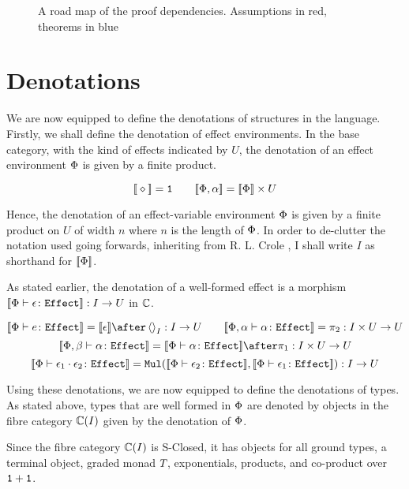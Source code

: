 \documentclass{Report}
\begin{document}
\begin{figure}[h!]
\begin{center}
{
    }
    \end{center}
\caption{A road map of the proof dependencies. Assumptions in red, theorems in blue}
\label{RoadMap}
\end{figure}


\section{Denotations}\label{PECDenotations}
We are now equipped to define the denotations of structures in the language. Firstly, we shall define the denotation of effect environments. In the base category, with the kind of effects indicated by $U$, the denotation of an effect environment $\P$ is given by a finite product.

\[
\deno{\nil} = \1 \quad\quad \deno{\P, \a} = \deno{\P}\times U    
\]

Hence, the denotation of an  effect-variable environment $\P$ is given by a finite product on $U$ of width $n$ where $n$ is the length of $\P$. In order to de-clutter the notation used going forwards, inheriting from R. L. Crole \needsRef, I shall write $I$ as shorthand for $\deno{\P}$.  


As stated earlier, the denotation of a well-formed effect is a morphism $\deno{\typerelation{\P}{\e}{\effect}}: I \rightarrow U$ in $\C$.

\[
    \deno{\typerelation{\P}{e}{\effect}} = \deno{\e} \after \term{I}: I\rightarrow U
    \quad\quad
    \deno{\typerelation{\P,\a}{\a}{\effect}} = \pp: I\times U \rightarrow U
\]\[
    \deno{\typerelation{\P, \b}{\a}{\effect}} = \deno{\typerelation{\P}{\a}{\effect}}\after\p: I\times U\rightarrow U
\]\[
    \deno{\typerelation{\P}{\e_1\dot \e_2}{\effect}} = \Mul(\deno{\typerelation{\P}{\e_2}{\effect}},\deno{\typerelation{\P}{\e_1}{\effect}}): I \rightarrow U
\]

Using these denotations, we are now equipped to define the denotations of types. As stated above, types that are well formed in $\P$ are denoted by objects in the fibre category $\C(I)$ given by the denotation of $\P$.

Since the fibre category $\C(I)$ is S-Closed, it has objects for all ground types, a terminal object, graded monad $\T{}{}$, exponentials, products, and co-product over $\1+\1$.
\end{document}
